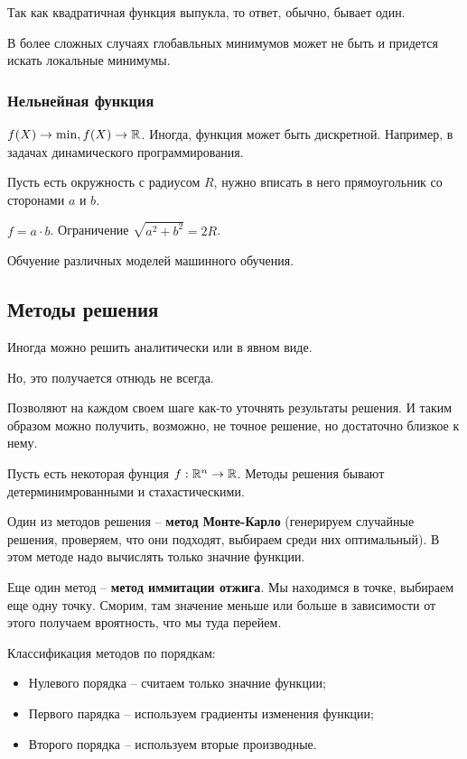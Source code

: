 Так как квадратичная функция выпукла, то ответ, обычно, бывает один.

В более сложных случаях глобавльных минимумов может не быть и придется искать локальные минимумы.

\subsubsection{Нельнейная функция}
$f(X) \to \min, f(X) \to \mathbb{R}$.
Иногда, функция может быть дискретной.
Например, в задачах динамического программирования.

\begin{example}
    Пусть есть окружность с радиусом $R$, нужно вписать в него прямоугольник со сторонами $a$ и $b$.

    $f = a \cdot b$.
    Ограничение $\sqrt{a^2 + b^2} = 2R$.
\end{example}

\begin{example}
    Обчуение различных моделей машинного обучения.
\end{example}


\subsection{Методы решения}
Иногда можно решить аналитически или в явном виде.

Но, это получается отнюдь не всегда.

\begin{definition}
    Позволяют на каждом своем шаге как-то уточнять результаты решения.
    И таким образом можно получить, возможно, не точное решение, но достаточно близкое к нему.
\end{definition}

Пусть есть некоторая фунция $f: \mathbb{R}^n \to \mathbb{R}$.
Методы решения бывают детерминимрованными и стахастическими.

Один из методов решения -- \textbf{метод Монте-Карло} (генерируем случайные решения, проверяем, что они подходят, выбираем среди них оптимальный).
В этом методе надо вычислять только значние функции.

Еще один метод -- \textbf{метод иммитации отжига}.
Мы находимся в точке, выбираем еще одну точку.
Сморим, там значение меньше или больше в зависимости от этого получаем вроятность, что мы туда перейем.

Классификация методов по порядкам:
\begin{itemize}
    \item Нулевого порядка -- считаем только значние функции;
    \item Первого парядка -- используем градиенты изменения функции;
    \item Второго порядка -- используем вторые производные.
\end{itemize}


